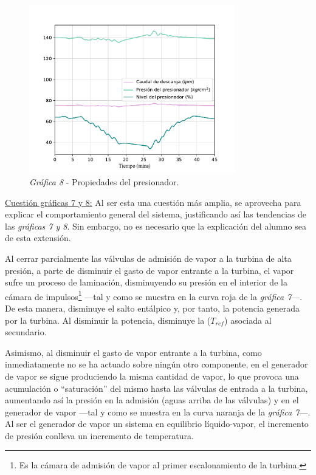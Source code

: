 \begin{figure}[!h]
  \centering
  \includegraphics[width=0.8\textwidth]{content/figures/sim1_presionador.pdf}
  \caption{\textit{Gráfica 8} - Propiedades del presionador.}
  \label{fig:sim1_presionador}
\end{figure}

\underline{Cuestión gráficas 7 y 8:} Al ser esta una cuestión más amplia, se aprovecha para explicar el comportamiento general del sistema, justificando así las tendencias de las \textit{gráficas 7 y 8}. Sin embargo, no es necesario que la explicación del alumno sea de esta extensión.

Al cerrar parcialmente las válvulas de admisión de vapor a la turbina de alta presión, a parte de disminuir el gasto de vapor entrante a la turbina, el vapor sufre un proceso de laminación, disminuyendo su presión en el interior de la cámara de impulsos\footnote{Es la cámara de admisión de vapor al primer escalonamiento de la turbina.} ---tal y como se muestra en la curva roja de la \textit{gráfica 7}---. De esta manera, disminuye el salto entálpico y, por tanto, la potencia generada por la turbina. Al disminuir la potencia, disminuye la ($T_{ref}$) asociada al secundario.

Asimismo, al disminuir el gasto de vapor entrante a la turbina, como inmediatamente no se ha actuado sobre ningún otro componente, en el generador de vapor se sigue produciendo la misma cantidad de vapor, lo que provoca una acumulación o ``saturación'' del mismo hasta las válvulas de entrada a la turbina, aumentando así la presión en la admisión (aguas arriba de las válvulas) y en el generador de vapor ---tal y como se muestra en la curva naranja de la \textit{gráfica 7}---. Al ser el generador de vapor un sistema en equilibrio líquido-vapor, el incremento de presión conlleva un incremento de temperatura.

